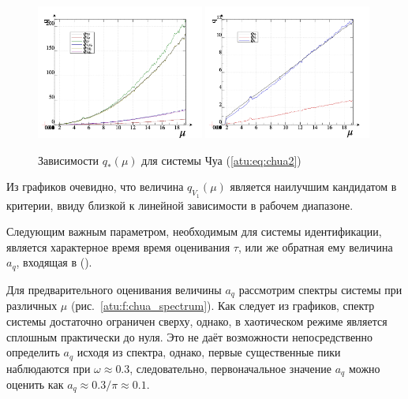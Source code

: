 \documentclass[a4paper,12pt]{article}
\begin{document}
\begin{figure}[htb!]
\centerline{
  \includegraphics[width=0.49\textwidth]{p/cha/chua/chua_q-p_mu2.png}
  \includegraphics[width=0.49\textwidth]{p/cha/chua/chua_q-p_mu1.png}
}
  \caption{Зависимости $q_{*}(\mu) $ для системы Чуа (\ref{atu:eq:chua2})}
\label{atu:f:chua_q}
\end{figure}

Из графиков очевидно, что величина $ q_{V_1}(\mu) $
является наилучшим кандидатом в критерии, ввиду близкой к линейной зависимости
в рабочем диапазоне.

Следующим важным параметром, необходимым для системы идентификации, является
характерное время время оценивания $\tau$, или же обратная ему величина $a_q$,
входящая в (). %

Для предварительного оценивания величины $a_q$ рассмотрим спектры системы при различных
$\mu$ (рис.~\ref{atu:f:chua_spectrum}). Как следует из графиков, спектр системы достаточно
ограничен сверху, однако, в хаотическом режиме является сплошным практически до нуля.
Это не даёт возможности непосредственно определить $a_q$ исходя из спектра,
однако, первые существенные пики наблюдаются при $ \omega \approx 0.3 $, следовательно,
первоначальное значение $a_q$ можно оценить как $ a_q \approx 0.3 / \pi \approx 0.1 $.
\end{document}
